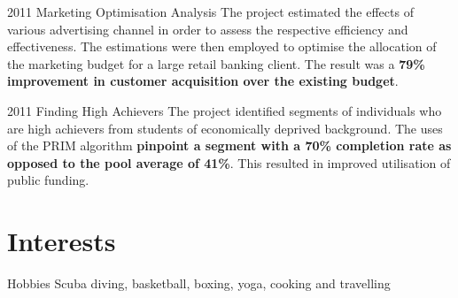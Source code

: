 \documentclass{tccv}
\begin{document}
\begin{yearlist}


  
\item{2011} {Marketing Optimisation Analysis} {The project estimated the effects of
  various advertising channel in order to assess the respective
  efficiency and effectiveness. The estimations were then employed to
  optimise the allocation of the marketing budget for a large retail
  banking client. The result was a \textbf{79\% improvement in
    customer acquisition over the existing budget}.}

\end{yearlist}

\begin{yearlist}
\item{2011}
     {Finding High Achievers}
     {The project identified segments of individuals who are high
       achievers from students of economically deprived
       background. The uses of the PRIM algorithm \textbf{pinpoint a
         segment with a 70\% completion rate as opposed to the pool
         average of 41\%}. This resulted in improved utilisation of
       public funding.}
  
\end{yearlist}

\vspace{10cm}


\section{Interests}

\begin{factlist}
\item{Hobbies} {Scuba diving, basketball, boxing, yoga, cooking and
  travelling}
\end{factlist}
\end{document}
